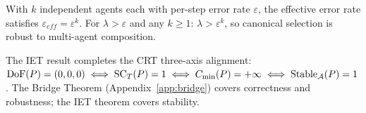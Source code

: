 \begin{remark}
With $k$ independent agents each with per-step error rate $\varepsilon$,
the effective error rate satisfies $\varepsilon_{eff}=\varepsilon^k$.
For $\lambda>\varepsilon$ and any $k\ge 1$: $\lambda>\varepsilon^k$,
so canonical selection is robust to multi-agent composition.
\end{remark}

\begin{remark}
The IET result completes the CRT three-axis alignment:
$\mathrm{DoF}(P)=(0,0,0)
\iff \mathrm{SC}_T(P)=1
\iff C_{\min}(P)=+\infty
\iff \mathrm{Stable}_{\mathcal{A}}(P)=1$.
The Bridge Theorem (Appendix~\ref{app:bridge}) covers correctness and robustness;
the IET theorem covers stability.
\end{remark}
